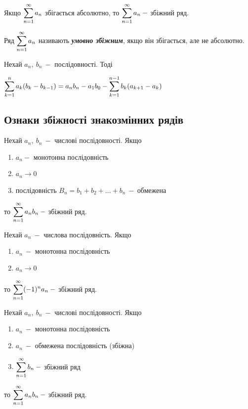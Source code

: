 \begin{theorem}
Якщо $\displaystyle\sum\limits_{n=1}^\infty a_n$ збігається абсолютно, то  $\displaystyle\sum\limits_{n=1}^\infty a_n \: -$ збіжний ряд.
\end{theorem}
\begin{definition}
    Ряд $\displaystyle\sum\limits_{n=1}^\infty a_n$ називають \textcolor{NavyBlue}{\textbf{\textit{умовно збіжним}}}, якщо він збігається, але не абсолютно. 
\end{definition}




\begin{theorem}
Нехай $a_n, \: b_n \: - $ послідовності. Тоді


\centerline{$\displaystyle\sum\limits_{k=1}^n a_k(b_k-b_{k-1}) = a_nb_n-a_1b_0-
\displaystyle\sum\limits_{k=1}^{n-1}b_k(a_{k+1}-a_k)$}
\end{theorem}

\subsection{\large{Ознаки збіжності знакозмінних рядів}}

\begin{theorem}
Нехай $a_n, \: b_n \: -$ числові послідовності. Якщо  
       \begin{enumerate}
           \item $a_n - $ монотонна послідовність 
           \item $a_n \rightarrow 0 $
           \item послідовність $B_n=b_1+b_2+...+b_n \: - \ $обмежена
       \end{enumerate}
 то $\Sum_{n=1}^\infty a_n  b_n \: - \ $збіжний ряд.

\end{theorem}
\begin{theorem}
Нехай $a_n \: - $ числова послідовність. Якщо  
       \begin{enumerate}
           \item $a_n  \: - $ монотонна послідовність 
           \item $a_n \rightarrow 0 $
       \end{enumerate}
 то $\Sum_{n=1}^\infty(-1)^n  a_n \: - \ $збіжний ряд.


\end{theorem}
\begin{theorem}
Нехай $a_n, \: b_n \: -$ числові послідовності. Якщо  
       \begin{enumerate}
           \item $a_n  \: - $ монотонна послідовність 
           \item $a_n  \: - $ обмежена послідовність (збіжна)
           \item  $\displaystyle\sum\limits_{n=1}^\infty b_n  \: - $ збіжний ряд
       \end{enumerate}
 то $\Sum_{n=1}^\infty a_n  b_n  \: - \ $збіжний ряд.


\end{theorem}

